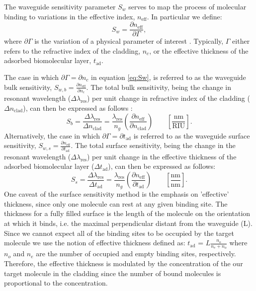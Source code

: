 \documentclass[aps,prl,twocolumn, superscriptaddress,nobalancelastpage]{revtex4}
\begin{document}
The waveguide sensitivity parameter $S_w$ serves to map the process of molecular binding to variations in the effective index, $n_\text{eff}$. In particular we define:
\begin{equation}
    S_w = \frac{\partial n_\text{eff}}{\partial \Gamma},
    \label{eq:Sw}
\end{equation}
where $\partial \Gamma$ is the variation of a physical parameter of interest \cite{sipresonators}. Typically, $\Gamma$ either refers to the refractive index of the cladding, $n_c$, or the effective thickness of the adsorbed biomolecular layer, $t_\text{ad}$.

The case in which $\partial \Gamma = \partial n_c$ in equation \eqref{eq:Sw}, is referred to as the waveguide bulk sensitivity, $S_{w,b} = \frac{\partial n_\text{eff}}{\partial n_c}$. The total bulk sensitivity, being the change in resonant wavelength ($\Delta \lambda_\text{res}$) per unit change in refractive index of the cladding ($\Delta n_\text{clad}$), can then be expressed as follows \cite{swg3}:
\begin{equation}
    S_b = \frac{\Delta \lambda_\text{res}}{\Delta n_\text{clad}} = \frac{\lambda_\text{res}}{n_g}\left(\frac{\partial n_\text{eff}}{\partial n_\text{clad}}\right) \qquad \left[\frac{\text{nm}}{\text{RIU}}\right].
    \label{eq:Sbulk}
\end{equation}
Alternatively, the case in which $\partial \Gamma = \partial t_\text{ad}$ is referred to as the waveguide surface sensitivity,  $S_{w,s} = \frac{\partial n_\text{eff}}{\partial t_\text{ad}}$. The total surface sensitivity, being the change in the resonant wavelength ($\Delta \lambda_\text{res}$) per unit change in the effective thickness of the adsorbed biomolecular layer ($ \Delta t_\text{ad}$), can then be expressed as follows:
\begin{equation}
    S_s = \frac{\Delta \lambda_\text{res}}{\Delta t_\text{ad}} = \frac{\lambda_\text{res}}{n_g}\left(\frac{\partial n_\text{eff}}{\partial t_\text{ad}}\right) \qquad \left[\frac{\text{nm}}{\text{nm}}\right].
    \label{eq:Ssurf}
\end{equation}
One caveat of the surface sensitivity method is the emphasis on 'effective' thickness, since only one molecule can rest at any given binding site. The thickness for a fully  filled surface is the length of the molecule on the orientation at which it binds, i.e. the maximal perpendicular distant from the waveguide (L). Since we cannot expect all of the binding sites to be occupied by the target molecule we use the notion of effective thickness defined as: 
$t_\text{ad}$ = $L\frac{n_o}{n_e+n_o}$ where $n_o$ and $n_e$ are the number of occupied and empty binding sites, respectively. Therefore, the effective thickness is modulated by the concentration of the our target molecule in the cladding since the number of bound molecules is proportional to the concentration.
\end{document}
